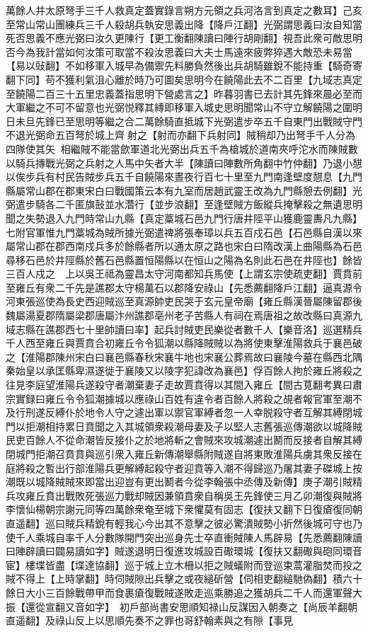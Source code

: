 萬餘人并太原弩手三千人救真定蓋實錄言朔方元領之兵河洛言到真定之數耳】己亥至常山常山團練兵三千人殺胡兵執安思義出降【降戶江翻】光弼謂思義曰汝自知當死否思義不應光弼曰汝久更陳行【更工衡翻陳讀曰陣行胡剛翻】視吾此衆可敵思明否今為我計當如何汝策可取當不殺汝思義曰大夫士馬遠來疲弊猝遇大敵恐未易當【易以䜴翻】不如移軍入城早為備禦先料勝負然後出兵胡騎雖銳不能持重【騎奇寄翻下同】苟不獲利氣沮心離於時乃可圖矣思明今在饒陽此去不二百里【九域志真定至饒陽二百三十五里忠義蓋指思明下營處言之】昨暮羽書已去計其先鋒來晨必至而大軍繼之不可不留意也光弼悦釋其縳即移軍入城史思明聞常山不守立解饒陽之圍明日未旦先鋒已至思明等繼之合二萬餘騎直抵城下光弼遣步卒五千自東門出戰賊守門不退光弼命五百弩於城上齊射之【射而亦翻下兵射同】賊稍却乃出弩手千人分為四隊使其矢相繼賊不能當歛軍道北光弼出兵五千為槍城於道南夾呼沱水而陳賊數以騎兵摶戰光弼之兵射之人馬中矢者大半【陳讀曰陣數所角翻中竹仲翻】乃退小憇以俟步兵有村民告賊步兵五千自饒陽來晝夜行百七十里至九門南逢壁度憇息【九門縣屬常山郡在郡東宋白曰戰國策云本有九室而居趙武靈王改為九門縣憩去例翻】光弼遣步騎各二千匿旗鼔並水濳行【並步浪翻】至逢壁賊方飯縱兵掩擊殺之無遺思明聞之失勢退入九門時常山九縣【真定藁城石邑九門行唐井陘平山獲鹿靈夀凡九縣】七附官軍惟九門藁城為賊所據光弼遣禆將張奉璋以兵五百戍石邑【石邑縣自漢以來屬常山郡在郡西南戍兵多於餘縣者所以通太原之路也宋白曰隋改漢上曲陽縣為石邑尋移石邑於井陘縣於舊石邑縣置恒陽縣以在恒山之陽為名則此石邑在井陘也】餘皆三百人戍之　上以吳王祗為靈昌太守河南都知兵馬使【上謂玄宗使疏吏翻】賈賁前至雍丘有衆二千先是譙郡太守楊萬石以郡降安祿山【先悉薦翻降戶江翻】逼真源令河東張巡使為長史西迎賊巡至真源帥吏民哭于玄元皇帝廟【雍丘縣漢晉屬陳留郡後魏屬湯夏郡隋屬梁郡唐屬汴州譙郡亳州老子苦縣人有祠在焉唐祖之故改縣曰真源九域志縣在譙郡西七十里帥讀曰率】起兵討賊吏民樂從者數千人【樂音洛】巡選精兵千人西至雍丘與賈賁合初雍丘令令狐潮以縣降賊賊以為將使東擊淮陽救兵于襄邑破之【淮陽郡陳州宋白曰襄邑縣春秋宋襄牛地也宋襄公葬焉故曰襄陵今墓在縣西北隅秦始皇以承匡縣卑濕遂徙于襄陵又以陵字犯諱改為襄邑】俘百餘人拘於雍丘將殺之往見李庭望淮陽兵遂殺守者潮棄妻子走故賈賁得以其間入雍丘【間古莧翻考異曰肅宗實録曰雍丘令令狐潮據城以應祿山百姓有違令者百餘人將殺之覘者報官軍至潮不及行刑遂反縛仆於地令人守之遽出軍以禦官軍縛者忽一人幸脱殺守者互解其縛閉城門以拒潮相持累日賁聞之入其城領衆殺潮母妻及子以堅人志舊張巡傳潮欲以城降賊民吏百餘人不從命潮皆反接仆之於地將斬之會賊來攻城潮遽出鬭而反接者自解其縛閉城門拒潮召賁賁與巡引衆入雍丘新傳潮舉縣附賊遂自將東敗淮陽兵虜其衆反接在庭將殺之暫出行部淮陽兵更解縛起殺守者迎賁等入潮不得歸巡乃屠其妻子磔城上按潮既以城降賊賊來即當出迎豈有更出鬭者今從李翰張中丞傳及新傳】庚子潮引賊精兵攻雍丘賁出戰敗死張巡力戰却賊因兼領賁衆自稱吳王先鋒使三月乙卯潮復與賊將李懷仙楊朝宗謝元同等四萬餘衆奄至城下衆懼莫有固志【復扶又翻下日復瘡復同朝直遥翻】巡曰賊兵精銳有輕我心今出其不意擊之彼必驚潰賊勢小折然後城可守也乃使千人乘城自率千人分數隊開門突出巡身先士卒直衝賊陳人馬辟易【先悉薦翻陳讀曰陣辟讀曰闢易讀如字】賊遂退明日復進攻城設百礮環城【復扶又翻礮與砲同環音宦】樓堞皆盡【堞達協翻】巡于城上立木柵以拒之賊蟻附而登巡束蒿灌脂焚而投之賊不得上【上時掌翻】時伺賊隙出兵擊之或夜縋斫營【伺相吏翻縋馳偽翻】積六十餘日大小三百餘戰帶甲而食裹瘡復戰賊遂敗走巡乘勝追之獲胡兵二千人而還軍聲大振【還從宣翻又音如字】　初戶部尚書安思順知禄山反謀因入朝奏之【尚辰羊翻朝直遥翻】及祿山反上以思順先奏不之罪也哥舒翰素與之有隙【事見
